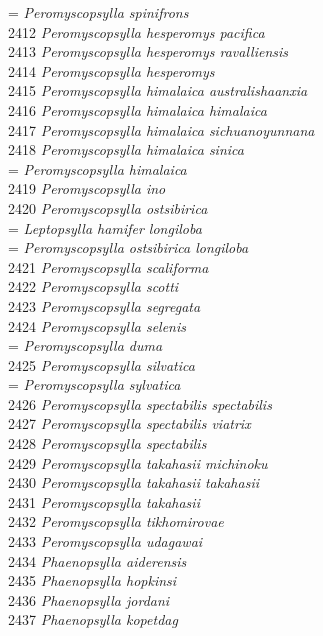 \documentclass[
]{article}
\begin{document}
= \emph{Peromyscopsylla spinifrons}\\
2412 \emph{Peromyscopsylla hesperomys pacifica}\\
2413 \emph{Peromyscopsylla hesperomys ravalliensis}\\
2414 \emph{Peromyscopsylla hesperomys}\\
2415 \emph{Peromyscopsylla himalaica australishaanxia}\\
2416 \emph{Peromyscopsylla himalaica himalaica}\\
2417 \emph{Peromyscopsylla himalaica sichuanoyunnana}\\
2418 \emph{Peromyscopsylla himalaica sinica}\\
= \emph{Peromyscopsylla himalaica}\\
2419 \emph{Peromyscopsylla ino}\\
2420 \emph{Peromyscopsylla ostsibirica}\\
= \emph{Leptopsylla hamifer longiloba}\\
= \emph{Peromyscopsylla ostsibirica longiloba}\\
2421 \emph{Peromyscopsylla scaliforma}\\
2422 \emph{Peromyscopsylla scotti}\\
2423 \emph{Peromyscopsylla segregata}\\
2424 \emph{Peromyscopsylla selenis}\\
= \emph{Peromyscopsylla duma}\\
2425 \emph{Peromyscopsylla silvatica}\\
= \emph{Peromyscopsylla sylvatica}\\
2426 \emph{Peromyscopsylla spectabilis spectabilis}\\
2427 \emph{Peromyscopsylla spectabilis viatrix}\\
2428 \emph{Peromyscopsylla spectabilis}\\
2429 \emph{Peromyscopsylla takahasii michinoku}\\
2430 \emph{Peromyscopsylla takahasii takahasii}\\
2431 \emph{Peromyscopsylla takahasii}\\
2432 \emph{Peromyscopsylla tikhomirovae}\\
2433 \emph{Peromyscopsylla udagawai}\\
2434 \emph{Phaenopsylla aiderensis}\\
2435 \emph{Phaenopsylla hopkinsi}\\
2436 \emph{Phaenopsylla jordani}\\
2437 \emph{Phaenopsylla kopetdag}\\
\end{document}

